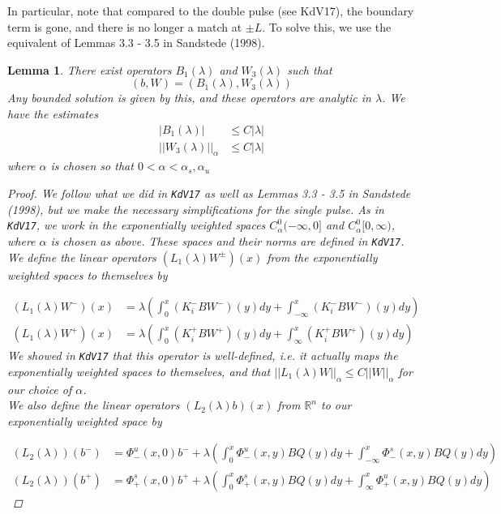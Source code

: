 \documentclass[12pt]{article}
\def\R{{\mathbb R}}
\newtheorem{lemma}{Lemma}
\begin{document}
In particular, note that compared to the double pulse (see \textrm{KdV17}), the boundary term is gone, and there is no longer a match at $\pm L$. To solve this, we use the equivalent of Lemmas 3.3 - 3.5 in Sandstede (1998).

\begin{lemma}\label{inv1}
There exist operators $B_1(\lambda)$ and $W_3(\lambda)$ such that 
\[
(b, W) = (B_1(\lambda), W_3(\lambda))
\]
Any bounded solution is given by this, and these operators are analytic in $\lambda$. We have the estimates
\begin{align*}
|B_1(\lambda)| &\leq C|\lambda| \\
||W_3(\lambda)||_\alpha &\leq C|\lambda|
\end{align*}
where $\alpha$ is chosen so that $0 < \alpha < \alpha_s, \alpha_u$
\begin{proof}
We follow what we did in \texttt{KdV17} as well as Lemmas 3.3 - 3.5 in Sandstede (1998), but we make the necessary simplifications for the single pulse. As in \texttt{KdV17}, we work in the exponentially weighted spaces $C^0_\alpha(-\infty, 0]$ and $C^0_\alpha[0, \infty)$, where $\alpha$ is chosen as above. These spaces and their norms are defined in \texttt{KdV17}. We define the linear operators $(L_1(\lambda)W^\pm)(x)$ from the exponentially weighted spaces to themselves by

\begin{align*}
(L_1(\lambda)W^-)(x) &= \lambda \left( \int_0^x (K_i^- B W^-)(y) dy + \int_{-\infty}^x (K_i^-B W^-)(y) dy \right) \\
(L_1(\lambda)W^+)(x) &= \lambda \left( \int_0^x (K_i^+ B W^+)(y) dy + \int_{\infty}^x (K_i^+ B W^+)(y) dy \right)
\end{align*}
We showed in \texttt{KdV17} that this operator is well-defined, i.e. it actually maps the exponentially weighted spaces to themselves, and that $||L_1(\lambda)W||_\alpha \leq C||W||_\alpha$ for our choice of $\alpha$.\\

We also define the linear operators $(L_2(\lambda)b)(x)$ from $\R^n$ to our exponentially weighted space by

\begin{align*}
(L_2(\lambda))(b^-) &= \Phi^u_-(x, 0)b^- + \lambda \left( \int_0^x \Phi^u_-(x, y) B Q(y)dy + \int_{-\infty}^x \Phi^s_-(x, y)B Q(y) dy \right)\\
(L_2(\lambda))(b^+) &= \Phi^s_+(x, 0)b^+ + \lambda \left( \int_0^x \Phi^s_+(x, y) B Q(y) dy + \int_{\infty}^x \Phi^u_+(x, y) B Q(y) dy \right)
\end{align*}


\end{proof}
\end{lemma}
\end{document}
